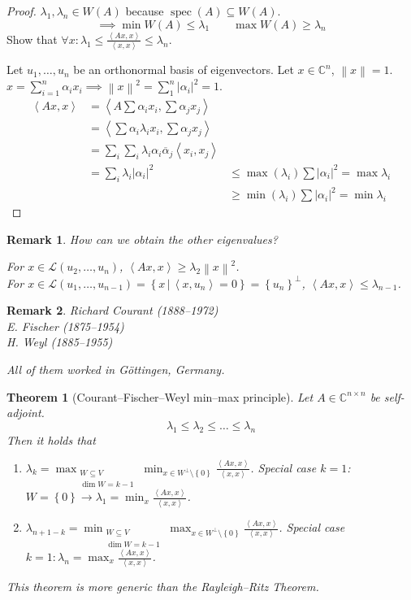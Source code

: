 \documentclass{article}
\newtheorem{theorem}{Theorem}  \numberwithin{theorem}{section}
\newtheorem{remark}{Remark}  \numberwithin{remark}{section}
\newcommand{\set}[1]{\left\{#1\right\}}
\newcommand{\setdef}[2]{\left\{\left.#1\,\right|\,#2\right\}}
\newcommand{\angel}[1]{\left\langle#1\right\rangle}
\newcommand{\norm}[1]{\left\|#1\right\|}
\newcommand{\card}[1]{\left|#1\right|}
\begin{document}
\begin{proof}
  $\lambda_1, \lambda_n \in W(A)$ because $\operatorname{spec}(A) \subseteq W(A)$.
  \[ \implies \min{W(A)} \leq \lambda_1 \qquad \max{W(A)} \geq \lambda_n \]
  Show that $\forall x: \lambda_1 \leq \frac{\angel{Ax, x}}{\angel{x, x}} \leq \lambda_n$.

  Let $u_1, \dots, u_n$ be an orthonormal basis of eigenvectors.
  Let $x \in \mathbb C^n$, $\norm{x} = 1$. $x = \sum_{i=1}^n \alpha_i x_i \implies \norm{x}^2 = \sum_{1}^n \card{\alpha_i}^2 = 1$.
  \begin{align*}
    \angel{Ax, x} &= \angel{A \sum \alpha_i x_i, \sum \alpha_j x_j} \\
      &= \angel{\sum \alpha_i \lambda_i x_i, \sum \alpha_j x_j} \\
      &= \sum_{i} \sum_{i} \lambda_i \alpha_i \overline{\alpha}_j \angel{x_i, x_j} \\
      &= \sum_{i} \lambda_i \card{\alpha_i}^2
      &\leq \max(\lambda_i) \sum \card{\alpha_i}^2 = \max{\lambda_i} \\
      & &\geq \min(\lambda_i) \sum \card{\alpha_i}^2 = \min{\lambda_i}
  \end{align*}
\end{proof}

\begin{remark} %
  How can we obtain the other eigenvalues?

  For $x \in \mathcal L(u_2, \dots, u_n)$, $\angel{Ax, x} \geq \lambda_2 \norm{x}^2$. \\
  For $x \in \mathcal L(u_1, \dots, u_{n-1}) = \setdef{x}{\angel{x, u_n} = 0} = \set{u_n}^\bot$, $\angel{Ax, x} \leq \lambda_{n-1}$.
\end{remark}

\begin{remark}
  Richard Courant (1888--1972) \\
  E. Fischer (1875--1954) \\
  H. Weyl (1885--1955)

  All of them worked in G\"ottingen, Germany.
\end{remark}

\begin{theorem}[Courant--Fischer--Weyl min--max principle] %
  Let $A \in \mathbb C^{n \times n}$ be self-adjoint.
  \[ \lambda_1 \leq \lambda_2 \leq \dots \leq \lambda_n \]
  Then it holds that
  \begin{enumerate}
    \item $\lambda_k = \max_{\substack{W \subseteq V \\ \dim{W} = k - 1}} \min_{x \in W^\bot \setminus \set{0}} \frac{\angel{Ax, x}}{\angel{x, x}}$. Special case $k = 1$: $W = \set{0} \to \lambda_1 = \min_x \frac{\angel{Ax, x}}{\angel{x, x}}$.
    \item $\lambda_{n+1 - k} = \min_{\substack{W \subseteq V \\ \dim{W} = k-1}} \max_{x \in W^\bot \setminus \set{0}} \frac{\angel{Ax, x}}{\angel{x, x}}$. Special case $k = 1: \lambda_n = \max_x \frac{\angel{Ax, x}}{\angel{x, x}}$.
  \end{enumerate}
  This theorem is more generic than the Rayleigh--Ritz Theorem.
\end{theorem}
\end{document}
